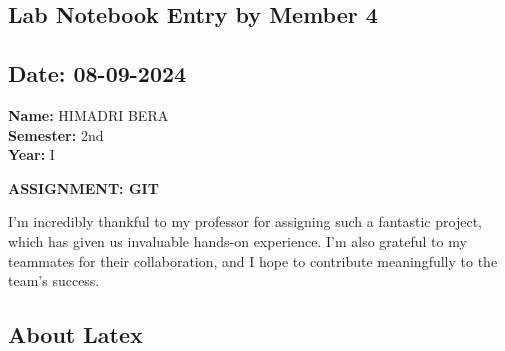 \documentclass[12pt]{article}
\begin{document}
\newpage
\subsection*{Lab Notebook Entry by Member 4}
\subsection*{Date: 08-09-2024}

\begin{flushright}
\textbf{Name:} HIMADRI BERA \\
\textbf{Semester:} 2nd \\
\textbf{Year:} I \\
\end{flushright}

\begin{center}
\Huge \textbf{ASSIGNMENT: GIT}
\end{center}

I'm incredibly thankful to my professor for assigning such a fantastic project, which has given us invaluable hands-on experience. I'm also grateful to my teammates for their collaboration, and I hope to contribute meaningfully to the team's success.

\newpage
\subsection*{About Latex}
\end{document}

